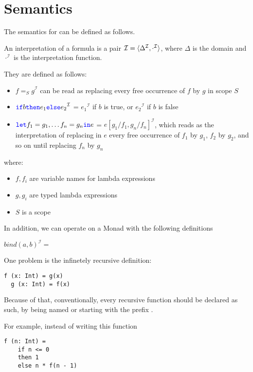 \section{Semantics}

\newcommand{\I}[1]{\ensuremath{{#1}^{\mathcal{I}}}}

The semantics for \Soda can be defined as follows.


An interpretation of a \Soda formula is a pair $\mathcal{I} = \langle \Delta _\mathcal{\I} , \I{\cdot} \rangle$, where $\Delta$ is the domain and $\I{\cdot}$ is the interpretation function.

They are defined as follows:

\begin{itemize}
    \item $\I{f =_{S} g}$ can be read as replacing every free occurrence of $f$ by $g$ in scope $S$

    \item $\I{\sif b \sthen e_{1} \selse e_{2}}$ = \I{e_{1}} if $b$ is true, or \I{e_{2}} if $b$ is false

    \item ${\color{blue}\texttt{{let}}} f_{1} = g_{1}, \ldots f_{n} = g_{n} {\color{blue}\texttt{{in}}} e$ =
    \I{e[g_{1} / f_{1}, g_{n} / f_{n}]}, which reads as the interpretation of
    replacing in $e$ every free occurrence of $f_{1}$ by $g_{1}$, $f_{2}$ by $g_{2}$, and so on until replacing $f_{n}$ by $g_{n}$
\end{itemize}

where:
\begin{itemize}
    \item $f, f_{i}$ are variable names for lambda expressions
    \item $g, g_{i}$ are typed lambda expressions
    \item $S$ is a scope
\end{itemize}


In addition, we can operate on a Monad with the following definitions

$\I{bind(a, b)} = $


One problem is the infinetely recursive definition:
\begin{lstlisting}[label={lst:exampleOfRecursion}]
  f (x: Int) = g(x)
  g (x: Int) = f(x)
\end{lstlisting}

Because of that, conventionally, every recursive function should be declared as such, by being named or starting with the prefix .

For example, instead of writing this function
\begin{lstlisting}[label={lst:exampleOfFactorialBadNaming}]
  f (n: Int) =
    if n <= 0
    then 1
    else n * f(n - 1)
\end{lstlisting}

